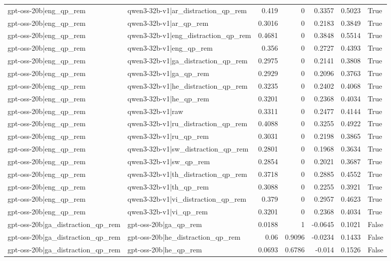 \begin{table}
\begin{tabular}{l l r r r r l}
gpt-oss-20b|eng_qp_rem & qwen3-32b-v1|ar_distraction_qp_rem & 0.419 & 0 & 0.3357 & 0.5023 & True \\
gpt-oss-20b|eng_qp_rem & qwen3-32b-v1|ar_qp_rem & 0.3016 & 0 & 0.2183 & 0.3849 & True \\
gpt-oss-20b|eng_qp_rem & qwen3-32b-v1|eng_distraction_qp_rem & 0.4681 & 0 & 0.3848 & 0.5514 & True \\
gpt-oss-20b|eng_qp_rem & qwen3-32b-v1|eng_qp_rem & 0.356 & 0 & 0.2727 & 0.4393 & True \\
gpt-oss-20b|eng_qp_rem & qwen3-32b-v1|ga_distraction_qp_rem & 0.2975 & 0 & 0.2141 & 0.3808 & True \\
gpt-oss-20b|eng_qp_rem & qwen3-32b-v1|ga_qp_rem & 0.2929 & 0 & 0.2096 & 0.3763 & True \\
gpt-oss-20b|eng_qp_rem & qwen3-32b-v1|he_distraction_qp_rem & 0.3235 & 0 & 0.2402 & 0.4068 & True \\
gpt-oss-20b|eng_qp_rem & qwen3-32b-v1|he_qp_rem & 0.3201 & 0 & 0.2368 & 0.4034 & True \\
gpt-oss-20b|eng_qp_rem & qwen3-32b-v1|raw & 0.3311 & 0 & 0.2477 & 0.4144 & True \\
gpt-oss-20b|eng_qp_rem & qwen3-32b-v1|ru_distraction_qp_rem & 0.4088 & 0 & 0.3255 & 0.4922 & True \\
gpt-oss-20b|eng_qp_rem & qwen3-32b-v1|ru_qp_rem & 0.3031 & 0 & 0.2198 & 0.3865 & True \\
gpt-oss-20b|eng_qp_rem & qwen3-32b-v1|sw_distraction_qp_rem & 0.2801 & 0 & 0.1968 & 0.3634 & True \\
gpt-oss-20b|eng_qp_rem & qwen3-32b-v1|sw_qp_rem & 0.2854 & 0 & 0.2021 & 0.3687 & True \\
gpt-oss-20b|eng_qp_rem & qwen3-32b-v1|th_distraction_qp_rem & 0.3718 & 0 & 0.2885 & 0.4552 & True \\
gpt-oss-20b|eng_qp_rem & qwen3-32b-v1|th_qp_rem & 0.3088 & 0 & 0.2255 & 0.3921 & True \\
gpt-oss-20b|eng_qp_rem & qwen3-32b-v1|vi_distraction_qp_rem & 0.379 & 0 & 0.2957 & 0.4623 & True \\
gpt-oss-20b|eng_qp_rem & qwen3-32b-v1|vi_qp_rem & 0.3201 & 0 & 0.2368 & 0.4034 & True \\
gpt-oss-20b|ga_distraction_qp_rem & gpt-oss-20b|ga_qp_rem & 0.0188 & 1 & -0.0645 & 0.1021 & False \\
gpt-oss-20b|ga_distraction_qp_rem & gpt-oss-20b|he_distraction_qp_rem & 0.06 & 0.9096 & -0.0234 & 0.1433 & False \\
gpt-oss-20b|ga_distraction_qp_rem & gpt-oss-20b|he_qp_rem & 0.0693 & 0.6786 & -0.014 & 0.1526 & False \\

\end{tabular}
\end{table}
